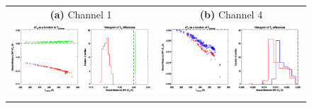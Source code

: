 \begin{figure}[htp]
  \centering
  \begin{tabular}{c c}
    \textsf{\textbf{(a)} Channel 1} &
    \textsf{\textbf{(b)} Channel 4} \\
    \includegraphics[bb=82 289 312 493,clip,scale=1.0]{graphics/dtb/atms_npp.ch1.TbStats.eps} &
    \includegraphics[bb=82 289 312 493,clip,scale=1.0]{graphics/dtb/atms_npp.ch4.TbStats.eps} \\\\


\end{tabular}
\end{figure}
